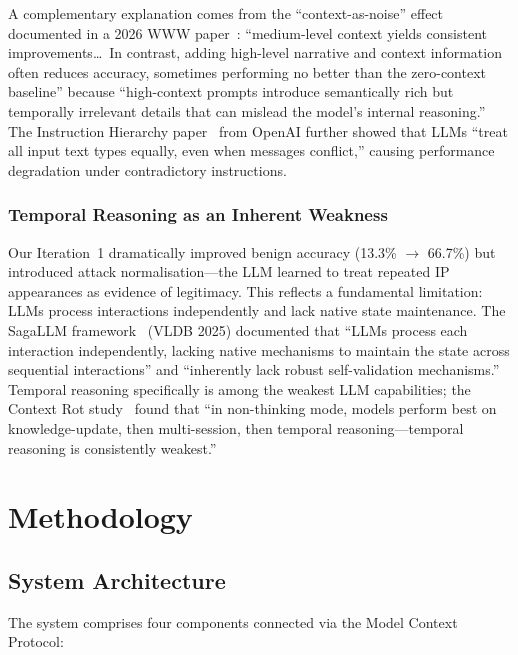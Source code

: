 \documentclass[12pt, a4paper, oneside]{report}
\begin{document}
A complementary explanation comes from the ``context-as-noise'' effect documented
in a 2026 WWW paper~\cite{contextasnoise2026}: ``medium-level context yields
consistent improvements\ldots\ In contrast, adding high-level narrative and context
information often reduces accuracy, sometimes performing no better than the
zero-context baseline'' because ``high-context prompts introduce semantically rich
but temporally irrelevant details that can mislead the model's internal reasoning.''
The Instruction Hierarchy paper~\cite{instructionhierarchy2024} from OpenAI further
showed that LLMs ``treat all input text types equally, even when messages conflict,''
causing performance degradation under contradictory instructions.

\subsection{Temporal Reasoning as an Inherent Weakness}

Our Iteration~1 dramatically improved benign accuracy (13.3\% $\to$ 66.7\%) but
introduced attack normalisation---the LLM learned to treat repeated IP appearances
as evidence of legitimacy. This reflects a fundamental limitation: LLMs process
interactions independently and lack native state maintenance. The SagaLLM
framework~\cite{sagallm2025} (VLDB 2025) documented that ``LLMs process each
interaction independently, lacking native mechanisms to maintain the state across
sequential interactions'' and ``inherently lack robust self-validation mechanisms.''
Temporal reasoning specifically is among the weakest LLM capabilities; the
Context Rot study~\cite{contextrot2025} found that ``in non-thinking mode, models
perform best on knowledge-update, then multi-session, then temporal reasoning---temporal reasoning is consistently weakest.''


\chapter{Methodology}
\label{ch:methodology}

\section{System Architecture}
\label{sec:architecture}

The system comprises four components connected via the Model Context Protocol:
\end{document}
